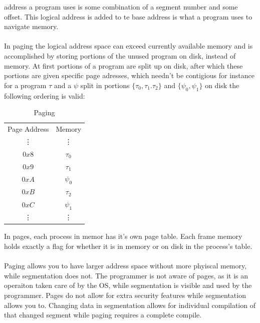 \documentclass[12pt]{article}
\begin{document}
address a program uses is some combination of a segment number and some offset. This logical 
address is added to te base address is what a program uses to navigate memory.\\\\
In paging the logical address space can exceed currently available memory and is accomplished 
by storing portions of the unused program on disk, instead of memory. At first portions of a 
program are split up on disk, after which these portions are given specific page adresses, which 
needn't be contigious for instance for a program $\tau$ and a $\psi$ split in portions $\{\tau_0, 
\tau_1. \tau_2\}$ and $\{\psi_0, \psi_1\}$  on disk the following ordering is valid:\\
\begin{table}[htb]
\centering
\caption{Paging}
\begin{tabular}{|c|c}
\cline{1-1}
Page Address      &              Memory                 \\ \cline{1-1}
\vdots      & \vdots                        \\ \cline{1-1}
$0x8$       & $\tau_0$                        \\ \cline{1-1}
$0x9$      & $\tau_1$                        \\ \cline{1-1}
$0xA$           & $\psi_0$                        \\ \cline{1-1}
$0xB$       & $\tau_2$                        \\ \cline{1-1}
$0xC$         & $\psi_1$                        \\ \cline{1-1}
\vdots      & \vdots                        \\ \cline{1-1}
\end{tabular}
\end{table}
\FloatBarrier
\noindent In pages, each process in memor has it's own page table. Each frame memory holds exactly a flag 
for whether it is in memory or on disk in the process's table.\\\\
Paging allows you to have larger address space without more phyiscal memory, while segmentation 
does not. The programmer is not aware of pages, as it is an operaiton taken care of by the OS, while 
segmentation is visible and used by the programmer. Pages do not allow for extra security features 
while segmentation allows you to. Changing data in segmentation allows for individual compilation 
of that changed segment while paging requires a complete compile. \\\\
\end{document}
